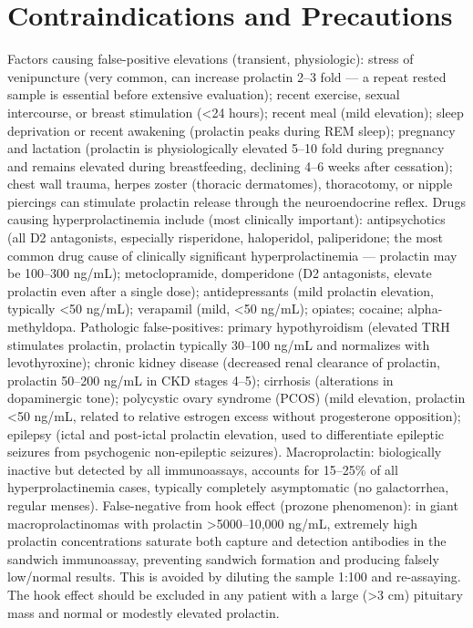 \section*{Contraindications and Precautions}
Factors causing false-positive elevations (transient, physiologic): stress of venipuncture (very common, can increase prolactin 2--3 fold --- a repeat rested sample is essential before extensive evaluation); recent exercise, sexual intercourse, or breast stimulation (<24 hours); recent meal (mild elevation); sleep deprivation or recent awakening (prolactin peaks during REM sleep); pregnancy and lactation (prolactin is physiologically elevated 5--10 fold during pregnancy and remains elevated during breastfeeding, declining 4--6 weeks after cessation); chest wall trauma, herpes zoster (thoracic dermatomes), thoracotomy, or nipple piercings can stimulate prolactin release through the neuroendocrine reflex. Drugs causing hyperprolactinemia include (most clinically important): antipsychotics (all D2 antagonists, especially risperidone, haloperidol, paliperidone; the most common drug cause of clinically significant hyperprolactinemia --- prolactin may be 100--300 ng/mL); metoclopramide, domperidone (D2 antagonists, elevate prolactin even after a single dose); antidepressants (mild prolactin elevation, typically <50 ng/mL); verapamil (mild, <50 ng/mL); opiates; cocaine; alpha-methyldopa. Pathologic false-positives: primary hypothyroidism (elevated TRH stimulates prolactin, prolactin typically 30--100 ng/mL and normalizes with levothyroxine); chronic kidney disease (decreased renal clearance of prolactin, prolactin 50--200 ng/mL in CKD stages 4--5); cirrhosis (alterations in dopaminergic tone); polycystic ovary syndrome (PCOS) (mild elevation, prolactin <50 ng/mL, related to relative estrogen excess without progesterone opposition); epilepsy (ictal and post-ictal prolactin elevation, used to differentiate epileptic seizures from psychogenic non-epileptic seizures). Macroprolactin: biologically inactive but detected by all immunoassays, accounts for 15--25\% of all hyperprolactinemia cases, typically completely asymptomatic (no galactorrhea, regular menses). False-negative from hook effect (prozone phenomenon): in giant macroprolactinomas with prolactin >5000--10,000 ng/mL, extremely high prolactin concentrations saturate both capture and detection antibodies in the sandwich immunoassay, preventing sandwich formation and producing falsely low/normal results. This is avoided by diluting the sample 1:100 and re-assaying. The hook effect should be excluded in any patient with a large (>3 cm) pituitary mass and normal or modestly elevated prolactin.

